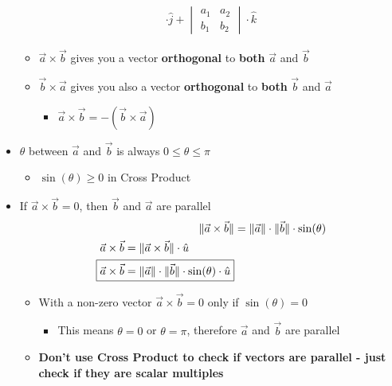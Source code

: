 \documentclass{article}
\begin{document}
\begin{itemize}
\begin{align}
    \cdot \hat{j} +
    \begin{vmatrix}
      a_1 & a_2 \\
      b_1 & b_2
    \end{vmatrix}
    \cdot \hat{k} \label{crossproduct-by-matrix}
  \end{align}
  \begin{itemize}
    \item $\vec{a}\times\vec{b}$ gives you a vector \textbf{orthogonal} to \textbf{both} $\vec{a}$ and $\vec{b}$
    \item $\vec{b}\times\vec{a}$ gives you also a vector \textbf{orthogonal} to \textbf{both} $\vec{b}$ and $\vec{a}$
    \begin{itemize}
      \item $\vec{a}\times\vec{b} = -(\vec{b}\times\vec{a})$
    \end{itemize}
  \end{itemize}
  \item $\theta$ between $\vec{a}$ and $\vec{b}$ is always $0\leq\theta\leq\pi$
  \begin{itemize}
    \item $\sin(\theta)\geq 0$ in Cross Product
  \end{itemize}
  \item If $\vec{a}\times\vec{b} = 0$, then $\vec{b}$ and $\vec{a}$ are parallel
  \begin{align}
      \|\vec{a}\times\vec{b}\| &= \|\vec{a}\|\cdot\|\vec{b}\|\cdot\sin(\theta) \label{mag-of-cross-product} \\
    \begin{split}
      \vec{a}\times\vec{b} &= \|\vec{a}\times\vec{b}\|\cdot\hat{u} \\
      \Aboxed{
        \vec{a}\times\vec{b} &= \|\vec{a}\|\cdot\|\vec{b}\|\cdot\sin(\theta)\cdot\hat{u}
      }
    \end{split}
  \end{align}
  \begin{itemize}
    \item With a non-zero vector  $\vec{a}\times\vec{b} = 0$ only if $\sin(\theta) = 0$
    \begin{itemize}
      \item This means $\theta = 0$ or $\theta = \pi$, therefore $\vec{a}$ and $\vec{b}$ are parallel
    \end{itemize}
  \item \textbf{Don't use Cross Product to check if vectors are parallel - just check if they are scalar multiples}

\end{itemize}
\end{itemize}
\end{document}
